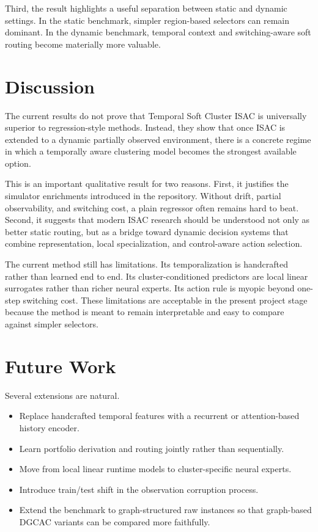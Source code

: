 \documentclass[conference]{IEEEtran}
\begin{document}
Third, the result highlights a useful separation between static and dynamic settings. In the static benchmark, simpler region-based selectors can remain dominant. In the dynamic benchmark, temporal context and switching-aware soft routing become materially more valuable.

\section{Discussion}

The current results do not prove that Temporal Soft Cluster ISAC is universally superior to regression-style methods. Instead, they show that once ISAC is extended to a dynamic partially observed environment, there is a concrete regime in which a temporally aware clustering model becomes the strongest available option.

This is an important qualitative result for two reasons. First, it justifies the simulator enrichments introduced in the repository. Without drift, partial observability, and switching cost, a plain regressor often remains hard to beat. Second, it suggests that modern ISAC research should be understood not only as better static routing, but as a bridge toward dynamic decision systems that combine representation, local specialization, and control-aware action selection.

The current method still has limitations. Its temporalization is handcrafted rather than learned end to end. Its cluster-conditioned predictors are local linear surrogates rather than richer neural experts. Its action rule is myopic beyond one-step switching cost. These limitations are acceptable in the present project stage because the method is meant to remain interpretable and easy to compare against simpler selectors.

\section{Future Work}

Several extensions are natural.
\begin{itemize}
\item Replace handcrafted temporal features with a recurrent or attention-based history encoder.
\item Learn portfolio derivation and routing jointly rather than sequentially.
\item Move from local linear runtime models to cluster-specific neural experts.
\item Introduce train/test shift in the observation corruption process.
\item Extend the benchmark to graph-structured raw instances so that graph-based DGCAC variants can be compared more faithfully.
\end{itemize}
\end{document}

